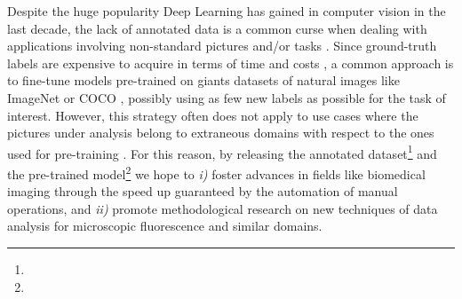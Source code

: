 Despite the huge popularity Deep Learning has gained in computer vision in the last decade, the lack of annotated data is a common curse when dealing with applications involving non-standard pictures and/or tasks \cite{curse_dataset_annotation}. 
Since ground-truth labels are expensive to acquire in terms of time and costs \cite{vija2009annotationcost, mullen2019comparing}, a common approach is to fine-tune models pre-trained on giants datasets of natural images like ImageNet \cite{ImageNet} or COCO \cite{COCO}, possibly using as few new labels as possible for the task of interest. 
However, this strategy often does not apply to use cases where the pictures under analysis belong to extraneous domains with respect to the ones used for pre-training \cite{TL_medical_imaging}.
For this reason, by releasing the annotated dataset\footnote{\dataset} and the pre-trained model\footnote{\linkmodel} we hope to \textit{i)} foster advances in fields like biomedical imaging through the speed up guaranteed by the automation of manual operations, and \textit{ii)} promote methodological research on new techniques of data analysis for microscopic fluorescence and similar domains.
